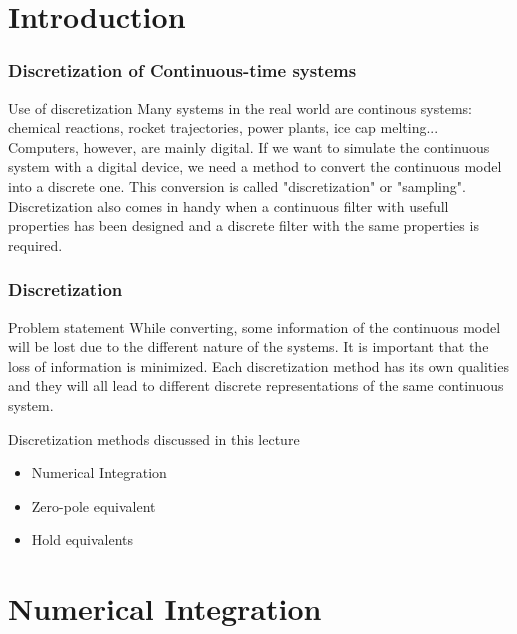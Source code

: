\section{Introduction}

\begin{frame}
	\frametitle{Discretization of Continuous-time systems}
	\begin{block}{Use of discretization}
		Many systems in the real world are continous systems: chemical reactions, rocket trajectories, power plants, ice cap melting... Computers, however, are mainly digital. If we want to simulate the continuous system with a digital device, we need a method to convert the continuous model into a discrete one.  This conversion is called "discretization" or "sampling". Discretization also comes in handy when a continuous filter with usefull properties has been designed and a discrete filter with the same properties is required.
	\end{block} 
\end{frame}

\begin{frame}
	\frametitle{Discretization}
	\begin{block}{Problem statement}
		While converting, some information of the continuous model will be lost due to the different nature of the systems. It is important that the loss of information is minimized. Each discretization method has its own qualities and they will all lead to different discrete representations of the same continuous system.
	\end{block}
	
	\begin{block}{Discretization methods discussed in this lecture}
		\begin{itemize}
			\item Numerical Integration
			\item Zero-pole equivalent
			\item Hold equivalents
		\end{itemize}
	\end{block}
\end{frame}

\section{Numerical Integration}

